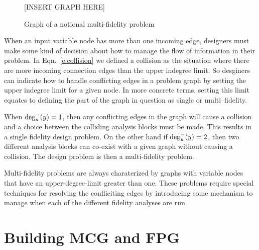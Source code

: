 	\begin{figure}
	  \begin{center}
	  [INSERT GRAPH HERE]
	  \caption{Graph of a notional multi-fidelity problem \label{f:collision_example}}
	  \end{center}
	\end{figure}

	When an input variable node has more than one incoming edge, designers must make
	some kind of decision about how to manage the flow of information in their problem. 
	In Eqn.~\ref{e:collision} we defined a collision as the situation where
	there are more incoming connection edges than the upper indegree limit. So desginers can
	indicate how to handle conflicting edges in a problem graph by setting the upper indegree limit
	for a given node. In more concrete terms, setting this limit equates to defining 
	the part of the graph in question as single or multi--fidelity. 

	When $\textrm{deg}_u^-(y)=1$, then any conflicting edges in the graph will cause a collision
	and a choice between the colliding analysis blocks must be made. This results in a 
	single fidelity design problem. On the other hand if $\textrm{deg}_u^-(y)=2$, then two 
	different analysis blocks can co-exist with a given graph without causing a 
	collision. The design problem is then a multi-fidelity problem.

	Multi-fidelity problems are always charaterized by graphs with variable 
	nodes that have an upper-degree-limit greater than one. These problems require 
	special techniques for resolving the confliciting edges by introducing some mechanism
	to manage when each of the different fidelity analyses are 
	run\cite{march2012provably,alexandrov2001approximation,Huang_Allen_Notz_Miller_2006}.


\section{Building MCG and FPG}
	\label{s:building graphs}
